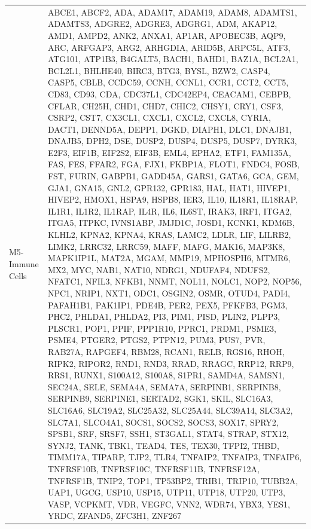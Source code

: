 \documentclass[
]{article}
\begin{document}
\begin{singlespace}
\begin{longtable}[t]{>{\raggedright\arraybackslash}p{1in}>{\raggedright\arraybackslash}p{5in}}
M5-Immune Cells & ABCE1, ABCF2, ADA, ADAM17, ADAM19, ADAM8, ADAMTS1, ADAMTS3, ADGRE2, ADGRE3, ADGRG1, ADM, AKAP12, AMD1, AMPD2, ANK2, ANXA1, AP1AR, APOBEC3B, AQP9, ARC, ARFGAP3, ARG2, ARHGDIA, ARID5B, ARPC5L, ATF3, ATG101, ATP1B3, B4GALT5, BACH1, BAHD1, BAZ1A, BCL2A1, BCL2L1, BHLHE40, BIRC3, BTG3, BYSL, BZW2, CASP4, CASP5, CBLB, CCDC59, CCNH, CCNL1, CCR1, CCT2, CCT5, CD83, CD93, CDA, CDC37L1, CDC42EP4, CEACAM1, CEBPB, CFLAR, CH25H, CHD1, CHD7, CHIC2, CHSY1, CRY1, CSF3, CSRP2, CST7, CX3CL1, CXCL1, CXCL2, CXCL8, CYRIA, DACT1, DENND5A, DEPP1, DGKD, DIAPH1, DLC1, DNAJB1, DNAJB5, DPH2, DSE, DUSP2, DUSP4, DUSP5, DUSP7, DYRK3, E2F3, EIF1B, EIF2S2, EIF3B, EML4, EPHA2, ETF1, FAM135A, FAS, FES, FFAR2, FGA, FJX1, FKBP1A, FLOT1, FNDC4, FOSB, FST, FURIN, GABPB1, GADD45A, GARS1, GATA6, GCA, GEM, GJA1, GNA15, GNL2, GPR132, GPR183, HAL, HAT1, HIVEP1, HIVEP2, HMOX1, HSPA9, HSPB8, IER3, IL10, IL18R1, IL18RAP, IL1R1, IL1R2, IL1RAP, IL4R, IL6, IL6ST, IRAK3, IRF1, ITGA2, ITGA5, ITPKC, IVNS1ABP, JMJD1C, JOSD1, KCNK1, KDM6B, KLHL2, KPNA2, KPNA4, KRAS, LAMC2, LDLR, LIF, LILRB2, LIMK2, LRRC32, LRRC59, MAFF, MAFG, MAK16, MAP3K8, MAPK1IP1L, MAT2A, MGAM, MMP19, MPHOSPH6, MTMR6, MX2, MYC, NAB1, NAT10, NDRG1, NDUFAF4, NDUFS2, NFATC1, NFIL3, NFKB1, NNMT, NOL11, NOLC1, NOP2, NOP56, NPC1, NRIP1, NXT1, ODC1, OSGIN2, OSMR, OTUD4, PADI4, PAFAH1B1, PAK1IP1, PDE4B, PER2, PEX5, PFKFB3, PGM3, PHC2, PHLDA1, PHLDA2, PI3, PIM1, PISD, PLIN2, PLPP3, PLSCR1, POP1, PPIF, PPP1R10, PPRC1, PRDM1, PSME3, PSME4, PTGER2, PTGS2, PTPN12, PUM3, PUS7, PVR, RAB27A, RAPGEF4, RBM28, RCAN1, RELB, RGS16, RHOH, RIPK2, RIPOR2, RND1, RND3, RRAD, RRAGC, RRP12, RRP9, RRS1, RUNX1, S100A12, S100A8, S1PR1, SAMD4A, SAMSN1, SEC24A, SELE, SEMA4A, SEMA7A, SERPINB1, SERPINB8, SERPINB9, SERPINE1, SERTAD2, SGK1, SKIL, SLC16A3, SLC16A6, SLC19A2, SLC25A32, SLC25A44, SLC39A14, SLC3A2, SLC7A1, SLCO4A1, SOCS1, SOCS2, SOCS3, SOX17, SPRY2, SPSB1, SRF, SRSF7, SSH1, ST3GAL1, STAT4, STRAP, STX12, SYNJ2, TANK, TBK1, TEAD4, TES, TEX30, TFPI2, THBD, TIMM17A, TIPARP, TJP2, TLR4, TNFAIP2, TNFAIP3, TNFAIP6, TNFRSF10B, TNFRSF10C, TNFRSF11B, TNFRSF12A, TNFRSF1B, TNIP2, TOP1, TP53BP2, TRIB1, TRIP10, TUBB2A, UAP1, UGCG, USP10, USP15, UTP11, UTP18, UTP20, UTP3, VASP, VCPKMT, VDR, VEGFC, VNN2, WDR74, YBX3, YES1, YRDC, ZFAND5, ZFC3H1, ZNF267\\

\end{longtable}
\end{singlespace}
\end{document}
